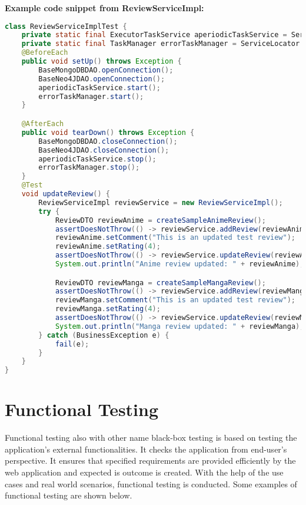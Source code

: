 \textbf{Example code snippet from ReviewServiceImpl:}
\begin{mdframed}[backgroundcolor=yellow!20, innerleftmargin=10pt, innerrightmargin=10pt]
    \begin{lstlisting}[language=java]
class ReviewServiceImplTest {
    private static final ExecutorTaskService aperiodicTaskService = ServiceLocator.getExecutorTaskService(ExecutorTaskServiceType.APERIODIC);
    private static final TaskManager errorTaskManager = ServiceLocator.getErrorsTaskManager();
    @BeforeEach
    public void setUp() throws Exception {
        BaseMongoDBDAO.openConnection();
        BaseNeo4JDAO.openConnection();
        aperiodicTaskService.start();
        errorTaskManager.start();
    }

    @AfterEach
    public void tearDown() throws Exception {
        BaseMongoDBDAO.closeConnection();
        BaseNeo4JDAO.closeConnection();
        aperiodicTaskService.stop();
        errorTaskManager.stop();
    }
    @Test
    void updateReview() {
        ReviewServiceImpl reviewService = new ReviewServiceImpl();
        try {
            ReviewDTO reviewAnime = createSampleAnimeReview();
            assertDoesNotThrow(() -> reviewService.addReview(reviewAnime));
            reviewAnime.setComment("This is an updated test review");
            reviewAnime.setRating(4);
            assertDoesNotThrow(() -> reviewService.updateReview(reviewAnime));
            System.out.println("Anime review updated: " + reviewAnime);

            ReviewDTO reviewManga = createSampleMangaReview();
            assertDoesNotThrow(() -> reviewService.addReview(reviewManga));
            reviewManga.setComment("This is an updated test review");
            reviewManga.setRating(4);
            assertDoesNotThrow(() -> reviewService.updateReview(reviewManga));
            System.out.println("Manga review updated: " + reviewManga);
        } catch (BusinessException e) {
            fail(e);
        }
    }
}
    \end{lstlisting}
\end{mdframed}

\newpage

\section{Functional Testing}
Functional testing also with other name black-box testing is based on testing the application's external functionalities. It checks the application from end-user's 
perspective. It ensures that specified requirements are provided efficiently by the web application and expected is outcome is created. 
With the help of the use cases and real world scenarios, functional testing is conducted. Some examples of functional testing are shown below.



